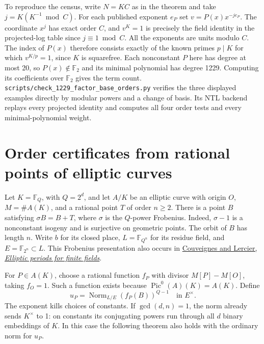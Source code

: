 \documentclass[11pt]{article}
\begin{document}
To reproduce the census, write \(N=KC\) as in the theorem and take
\(j=K(K^{-1}\bmod C)\). For each published exponent \(e_P\) set
\(v=P(x)x^{-j e_P}\). The coordinate \(x^j\) has exact order \(C\), and
\(v^K=1\) is precisely the field identity in the projected-log table
since \(j\equiv1\bmod C\). All the exponents are units modulo \(C\).
The index of \(P(x)\) therefore consists exactly of the known primes
\(p\mid K\) for which \(v^{K/p}=1\), since \(K\) is squarefree. Each
nonconstant \(P\) here has degree at most 20, so \(P(x)\notin\mathbb F_2\)
and its minimal polynomial has degree 1229. Computing its coefficients
over \(\mathbb F_2\) gives the term count.
\nolinkurl{scripts/check_1229_factor_base_orders.py} verifies the three
displayed examples directly by modular powers and a change of basis.
Its NTL backend replays every projected identity and computes all
four order tests and every minimal-polynomial weight.

\section{Order certificates from rational points of elliptic curves}
\label{sec:elliptic-ray}
Let \(K=\mathbb F_Q\), with \(Q=2^d\), and let \(A/K\) be an elliptic
curve with origin \(O\), \(M=\#A(K)\), and a rational point \(T\) of
order \(n\ge2\). There is a point \(B\) satisfying
\(\sigma B=B+T\), where \(\sigma\) is the \(Q\)-power Frobenius.
Indeed, \(\sigma-1\) is a nonconstant isogeny and is surjective on
geometric points. The orbit of \(B\) has length \(n\). Write \(b\) for
its closed place, \(L=\mathbb F_{Q^n}\) for its residue field, and
\(E=\mathbb F_{2^n}\subset L\). This Frobenius presentation also occurs
in \href{https://arxiv.org/abs/0802.0165}{Couveignes and Lercier,
\emph{Elliptic periods for finite fields}}.

For \(P\in A(K)\), choose a rational function \(f_P\) with divisor
\(M[P]-M[O]\), taking \(f_O=1\). Such a function exists because
\(\operatorname{Pic}^0(A)(K)=A(K)\). Define
\[
 u_P=\operatorname{Norm}_{L/E}(f_P(B))^{Q-1}\quad\text{in }E^\times .
\]
The exponent kills choices of constants. If \(\gcd(d,n)=1\), the
norm already sends \(K^\times\) to 1: on constants its conjugating
powers run through all \(d\) binary embeddings of \(K\). In this
case the following theorem also holds with the ordinary norm for \(u_P\).
\end{document}
